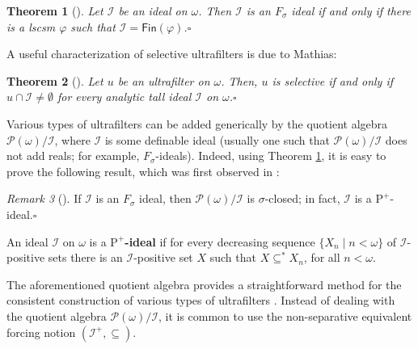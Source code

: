 \documentclass{amsart}
\newtheorem{theorem}{Theorem}[section]
\theoremstyle{definition}
\theoremstyle{remark}
\newtheorem{remark}[theorem]{Remark}
\numberwithin{equation}{section}
\begin{document}
\begin{theorem}[\cite{MR1124539}]\label{Thm:Mazur}
   Let $\mathcal{I}$ be an ideal on $\omega$. Then $\mathcal{I}$ is an $F_{\sigma}$ ideal if and only if there is a lscsm $\varphi$ such that $\mathcal{I}=\mathsf{Fin}(\varphi)$.\hfill $\square$
\end{theorem}

A useful characterization of selective ultrafilters is due to Mathias:

\begin{theorem}[\cite{MR491197}]\label{T:Mathias-Selective}
    Let $u$ be an ultrafilter on $\omega$. Then, $u$ is selective if and only if $u \cap \mathcal{I} \ne \emptyset$ for every analytic tall ideal $\mathcal{I}$ on $\omega$.\hfill $\square$
\end{theorem}


Various types of ultrafilters can be added generically by the quotient algebra $\mathcal{P}(\omega)/\mathcal{I}$, where $\mathcal{I}$ is some definable ideal (usually one such that $\mathcal{P}(\omega)/\mathcal{I}$ does not add reals; for example, $F_{\sigma}$-ideals). Indeed, using Theorem \ref{Thm:Mazur}, it is easy to prove the following result, which was first observed in \cite{MR748847}:

\begin{remark}[\cite{MR748847}]\label{Remark:Just-Krawczyk}
    If $\mathcal{I}$ is an $F_{\sigma}$ ideal, then $\mathcal{P}(\omega)/\mathcal{I}$ is $\sigma$-closed; in fact, $\mathcal{I}$ is a $\text{P}^{+}$-ideal.\hfill $\square$
\end{remark}

An ideal $\mathcal{I}$ on $\omega$ is a {\bf $\text{P}^{+}$-ideal} if for every decreasing sequence $\{X_{n} \mid  n < \omega\}$ of $\mathcal{I}$-positive sets there is an $\mathcal{I}$-positive set $X$ such that $X \subseteq^{*} X_{n}$, for all $n < \omega$.

The aforementioned quotient algebra provides a straightforward method for the consistent construction of various types of ultrafilters \cite{MR2861027}. Instead of dealing with the quotient algebra $\mathcal{P}(\omega)/\mathcal{I}$, it is common to use the non-separative equivalent forcing notion $(\mathcal{I}^{+}, \subseteq)$.
\end{document}
